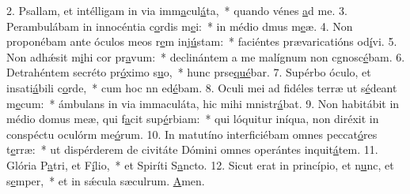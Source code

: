 2. Psallam, et intélligam in via imm\uline{a}cul\uline{á}ta,~* quando vénes \uline{a}d me.
3. Perambulábam in innocéntia c\uline{o}rdis m\uline{e}i:~* in médio dmus m\uline{e}æ.
4. Non proponébam ante óculos meos r\uline{e}m inj\uline{ú}stam:~* faciéntes prævaricatións od\uline{í}vi.
5. Non adhǽsit m\uline{i}hi cor pr\uline{a}vum:~* declinántem a me malígnum non cgnosc\uline{é}bam.
6. Detrahéntem secréto pr\uline{ó}ximo s\uline{u}o,~* hunc prse\uline{qué}bar.
7. Supérbo óculo, et insati\uline{á}bili c\uline{o}rde,~* cum hoc nn ed\uline{é}bam.
8. Oculi mei ad fidéles terræ ut s\uline{é}deant m\uline{e}cum:~* ámbulans in via immaculáta, hic mihi mnistr\uline{á}bat.
9. Non habitábit in médio domus meæ, qui f\uline{a}cit sup\uline{é}rbiam:~* qui lóquitur iníqua, non diréxit in conspéctu oculórm me\uline{ó}rum.
10. In matutíno interficiébam omnes peccat\uline{ó}res t\uline{e}rræ:~* ut dispérderem de civitáte Dómini omnes operántes inquit\uline{á}tem.
11. Glória P\uline{a}tri, et F\uline{í}lio,~* et Spiríti S\uline{a}ncto.
12. Sicut erat in princípio, et n\uline{u}nc, et s\uline{e}mper,~* et in sǽcula sæculrum. \uline{A}men.
